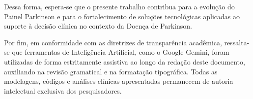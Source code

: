 Dessa forma, espera-se que o presente trabalho contribua para a evolução do Painel Parkinson e para o fortalecimento de soluções tecnológicas aplicadas ao suporte à decisão clínica no contexto da Doença de Parkinson.

Por fim, em conformidade com as diretrizes de transparência acadêmica, ressalta-se que ferramentas de Inteligência Artificial, como o Google Gemini, foram utilizadas de forma estritamente assistiva ao longo da redação deste documento, auxiliando na revisão gramatical e na formatação tipográfica. Todas as modelagens, códigos e análises clínicas apresentadas permanecem de autoria intelectual exclusiva dos pesquisadores.